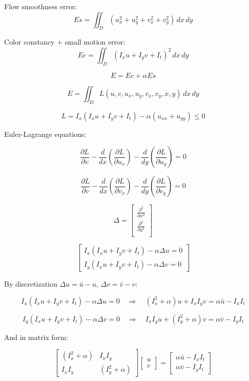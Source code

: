\documentclass{article}
\begin{document}
\begin{multicols}{2}
	\noindent Flow smoothness error:
	\[ Es = \iint_D (u_{x}^2 + u_{y}^2 + v_{x}^2 + v_{y}^2) \, dx \, dy \]

	\noindent Color constancy + small motion error:
	\[ Ec = \iint_D (I_{x}u + I_{y}v + I_{t})^2 \, dx \, dy \]

	\[ E = Ec + \alpha Es \]

	\[ E = \iint_D L(u, v, u_x, u_y, v_x, v_y, x, y) \, dx \, dy \]

	\[ L = I_x (I_{x}u + I_{y}v + I_{t}) - \alpha (u_{xx} + u_{yy}) \leq 0 \]

	Euler-Lagrange equations:

	\[ \frac{\partial L}{\partial v} - \frac{d}{dx} \left( \frac{\partial L}{\partial u_{x}} \right) - \frac{d}{dy} \left( \frac{\partial L}{\partial u_{y}} \right) = 0 \]

	\[ \frac{\partial L}{\partial v} - \frac{d}{dx} \left( \frac{\partial L}{\partial v_{x}} \right) - \frac{d}{dy} \left( \frac{\partial L}{\partial v_{y}} \right) = 0 \]


	\[ \Delta =
		\begin{bmatrix}
			\frac{\partial^2}{\partial x^2} \\
			\frac{\partial^2}{\partial y^2} \\
		\end{bmatrix} \]

	\[ \begin{bmatrix}
			I_x (I_{x}u + I_{y}v + I_{t}) - \alpha \Delta u = 0 \\
			I_y (I_{x}u + I_{y}v + I_{t}) - \alpha \Delta v = 0
		\end{bmatrix} \]

	By discretization \(\Delta u = \bar{u} - u\), \(\Delta v = \bar{v} - v\):

	\[
		I_x (I_x u + I_y v + I_t) - \alpha \Delta u = 0 \quad \Rightarrow \quad (I_x^2 + \alpha)u + I_x I_y v = \alpha \bar{u} - I_x I_t
	\]

	\[
		I_y (I_x u + I_y v + I_t) - \alpha \Delta v = 0 \quad \Rightarrow \quad I_x I_y u + (I_y^2 + \alpha)v = \alpha \bar{v} - I_y I_t
	\]

	And in matrix form:

	\[
		\begin{bmatrix}
			(I_x^2 + \alpha) & I_x I_y          \\
			I_x I_y          & (I_y^2 + \alpha)
		\end{bmatrix}
		\begin{bmatrix}
			u \\
			v
		\end{bmatrix}
		=
		\begin{bmatrix}
			\alpha \bar{u} - I_x I_t \\
			\alpha \bar{v} - I_y I_t
		\end{bmatrix}
	\]


\end{multicols}
\end{document}

